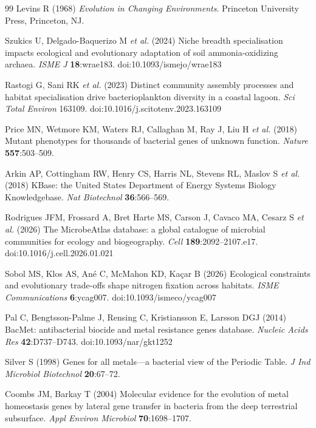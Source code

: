 \documentclass[times]{zHenriquesLab-StyleBioRxiv}
\begin{document}
\begin{thebibliography}{99}
Levins R (1968) \textit{Evolution in Changing Environments}. Princeton
University Press, Princeton, NJ.

Szukics U, Delgado-Baquerizo M \textit{et al.} (2024) Niche breadth
specialisation impacts ecological and evolutionary adaptation of soil
ammonia-oxidizing archaea. \textit{ISME J} \textbf{18}:wrae183.
doi:10.1093/ismejo/wrae183

Rastogi G, Sani RK \textit{et al.} (2023) Distinct community assembly processes
and habitat specialisation drive bacterioplankton diversity in a coastal lagoon.
\textit{Sci Total Environ} 163109. doi:10.1016/j.scitotenv.2023.163109

Price MN, Wetmore KM, Waters RJ, Callaghan M, Ray J, Liu H \textit{et al.}
(2018) Mutant phenotypes for thousands of bacterial genes of unknown function.
\textit{Nature} \textbf{557}:503--509.

Arkin AP, Cottingham RW, Henry CS, Harris NL, Stevens RL, Maslov S \textit{et
al.} (2018) KBase: the United States Department of Energy Systems Biology
Knowledgebase. \textit{Nat Biotechnol} \textbf{36}:566--569.

Rodrigues JFM, Frossard A, Bret Harte MS, Carson J, Cavaco MA, Cesarz S
\textit{et al.} (2026) The MicrobeAtlas database: a global catalogue of
microbial communities for ecology and biogeography. \textit{Cell}
\textbf{189}:2092--2107.e17. doi:10.1016/j.cell.2026.01.021

Sobol MS, Klos AS, Ané C, McMahon KD, Kaçar B (2026) Ecological constraints
and evolutionary trade-offs shape nitrogen fixation across habitats.
\textit{ISME Communications} \textbf{6}:ycag007. doi:10.1093/ismeco/ycag007

Pal C, Bengtsson-Palme J, Rensing C, Kristiansson E, Larsson DGJ (2014) BacMet:
antibacterial biocide and metal resistance genes database. \textit{Nucleic Acids
Res} \textbf{42}:D737--D743. doi:10.1093/nar/gkt1252

Silver S (1998) Genes for all metals---a bacterial view of the Periodic Table.
\textit{J Ind Microbiol Biotechnol} \textbf{20}:67--72.

Coombs JM, Barkay T (2004) Molecular evidence for the evolution of metal
homeostasis genes by lateral gene transfer in bacteria from the deep terrestrial
subsurface. \textit{Appl Environ Microbiol} \textbf{70}:1698--1707.


\end{thebibliography}
\end{document}
